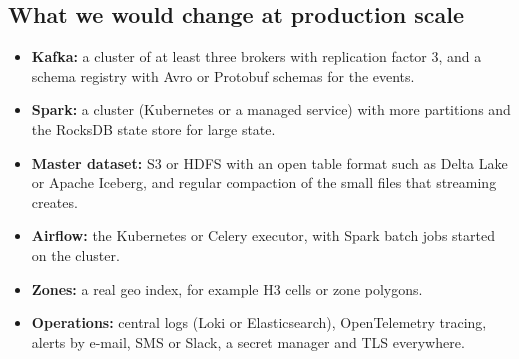 \subsection{What we would change at production scale}
\begin{itemize}
\item \textbf{Kafka:} a cluster of at least three brokers with replication factor 3, and a schema registry
with Avro or Protobuf schemas for the events.
\item \textbf{Spark:} a cluster (Kubernetes or a managed service) with more partitions and the RocksDB state
store for large state.
\item \textbf{Master dataset:} S3 or HDFS with an open table format such as Delta Lake or Apache Iceberg,
and regular compaction of the small files that streaming creates.
\item \textbf{Airflow:} the Kubernetes or Celery executor, with Spark batch jobs started on the cluster.
\item \textbf{Zones:} a real geo index, for example H3 cells or zone polygons.
\item \textbf{Operations:} central logs (Loki or Elasticsearch), OpenTelemetry tracing, alerts by e-mail,
SMS or Slack, a secret manager and TLS everywhere.
\end{itemize}
